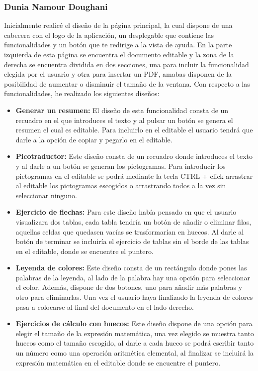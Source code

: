 \subsubsection{Dunia Namour Doughani}
Inicialmente realicé el diseño de la página principal, la cual dispone de una cabecera con el logo de la aplicación, un desplegable que contiene las funcionalidades y un botón que te redirige a la vista de ayuda. En la parte izquierda de esta página se encuentra el documento editable y la zona de la derecha se encuentra dividida en dos secciones, una para incluir la funcionalidad elegida por el usuario y otra para insertar un PDF, amabas disponen de la posibilidad de aumentar o disminuir el tamaño de la ventana. Con respecto a las funcionalidades, he realizado los siguientes diseños:
\begin{itemize}
  \item \textbf{Generar un resumen:} El diseño de esta funcionalidad consta de un recuadro en el que introduces el texto y al pulsar un botón se genera el resumen el cual es editable. Para incluirlo en el editable el usuario tendrá que darle a la opción de copiar y pegarlo en el editable. 
  \item \textbf{Picotraductor:} Este diseño consta de un recuadro donde introduces el texto y al darle a un botón se generan los pictogramas. Para introducir los pictogramas en el editable se podrá mediante la tecla CTRL + click arrastrar al editable los pictogramas escogidos o arrastrando todos a la vez sin seleccionar ninguno.
  \item \textbf{Ejercicio de flechas:} Para este diseño había pensado en que el usuario visualizara dos tablas, cada tabla tendría un botón de añadir o eliminar filas, aquellas celdas que quedasen vacías se trasformarían en huecos. Al darle al botón de terminar se incluiría el ejercicio de tablas sin el borde de las tablas en el editable, donde se encuentre el puntero.
  \item  \textbf{Leyenda de colores:} Este diseño consta de un rectángulo donde pones las palabras de la leyenda, al lado de la palabra hay una opción para seleccionar el color. Además, dispone de dos botones, uno para añadir más palabras y otro para eliminarlas. Una vez el usuario haya finalizado la leyenda de colores pasa a colocarse al final del documento en el lado derecho.
  \item  \textbf{Ejercicios de cálculo con huecos:} Este diseño dispone de una opción para elegir el tamaño de la expresión matemática, una vez elegido se muestra tanto huecos como el tamaño escogido, al darle a cada hueco se podrá escribir tanto un número como una operación aritmética elemental, al finalizar se incluirá la expresión matemática en el editable donde se encuentre el puntero.

\end{itemize}
